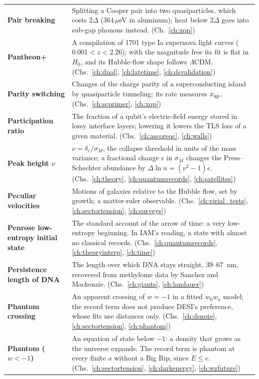 {\begin{longtable}{@{}>{\raggedright\arraybackslash}p{}>{\raggedright\arraybackslash}p{}@{}}
\textbf{Pair breaking} & Splitting a Cooper pair into two quasiparticles, which costs $2\Delta$ ($364\,\mu$eV in aluminum); heat below $2\Delta$ goes into sub-gap phonons instead. {\footnotesize(Ch.~\ref{ch:xqp})}\\[1pt]
\textbf{Pantheon+} & A compilation of 1701 type Ia supernova light curves ($0.001<z<2.26$); with the magnitude free its fit is flat in $H_0$, and its Hubble-flow shape follows $\Lambda$CDM. {\footnotesize(Chs.~\ref{ch:dual}, \ref{ch:latetime}, \ref{ch:dsvalidation})}\\[1pt]
\textbf{Parity switching} & Changes of the charge parity of a superconducting island by quasiparticle tunneling; its rate measures $x_{\mathrm{qp}}$. {\footnotesize(Chs.~\ref{ch:scprimer}, \ref{ch:xqp})}\\[1pt]
\textbf{Participation ratio} & The fraction of a qubit's electric-field energy stored in lossy interface layers; lowering it lowers the TLS loss of a given material. {\footnotesize(Chs.~\ref{ch:ascoreqc}, \ref{ch:walls})}\\[1pt]
\textbf{Peak height $\nu$} & $\nu=\delta_c/\sigma_M$, the collapse threshold in units of the mass variance; a fractional change $\epsilon$ in $\sigma_M$ changes the Press--Schechter abundance by $\Delta\ln n=(\nu^2-1)\epsilon$. {\footnotesize(Chs.~\ref{ch:theory}, \ref{ch:quantumrecords}, \ref{ch:satellites})}\\[1pt]
\textbf{Peculiar velocities} & Motions of galaxies relative to the Hubble flow, set by growth; a matter-ruler observable. {\footnotesize(Chs.~\ref{ch:virial_tests}, \ref{ch:sectortension}, \ref{ch:surveys})}\\[1pt]
\textbf{Penrose low-entropy initial state} & The standard account of the arrow of time: a very low-entropy beginning. In IAM's reading, a state with almost no classical records. {\footnotesize(Chs.~\ref{ch:quantumrecords}, \ref{ch:theoryinterp}, \ref{ch:time})}\\[1pt]
\textbf{Persistence length of DNA} & The length over which DNA stays straight, 39--67~nm, recovered from methylome data by Sanchez and Mackenzie. {\footnotesize(Chs.~\ref{ch:giants}, \ref{ch:landauer})}\\[1pt]
\textbf{Phantom crossing} & An apparent crossing of $w=-1$ in a fitted $w_0w_a$ model; the record term does not produce DESI's preference, whose fits use distances only. {\footnotesize(Chs.~\ref{ch:dsnote}, \ref{ch:sectortension}, \ref{ch:phantom})}\\[1pt]
\textbf{Phantom ($w<-1$)} & An equation of state below $-1$: a density that grows as the universe expands. The record term is phantom at every finite $a$ without a Big Rip, since $E\le e$. {\footnotesize(Chs.~\ref{ch:sectortension}, \ref{ch:darkenergy}, \ref{ch:wzfuture})}\\[1pt]

\end{longtable}}
